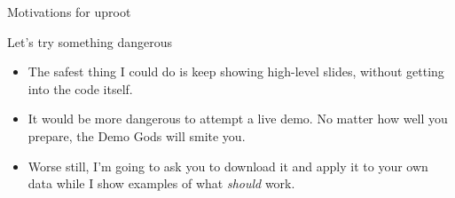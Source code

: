 \documentclass[aspectratio=169]{beamer}
\begin{document}
\begin{frame}{Motivations for uproot}
\vspace{0.25 cm}
\begin{center}
\end{center}
\end{frame}

\begin{frame}{Let's try something dangerous}
\vspace{0.5 cm}
\Large
\begin{itemize}\setlength{\itemsep}{0.3 cm}
\item The safest thing I could do is keep showing high-level slides, without getting into the code itself.
\item<2-> It would be more dangerous to attempt a live demo. No matter how well you prepare, the Demo Gods will smite you.
\item<3-> Worse still, I'm going to ask you to download it and apply it to your own data while I show examples of what {\it should} work.
\end{itemize}

\large
\vspace{0.5 cm}
\end{frame}
\end{document}
